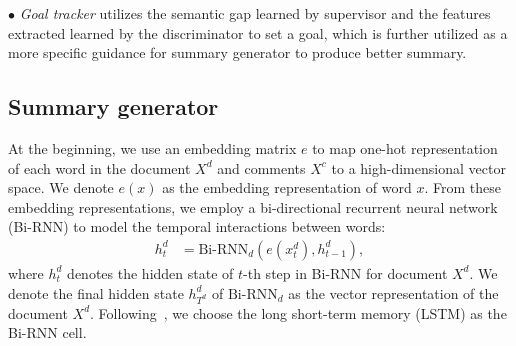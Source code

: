 \documentclass[letterpaper]{article} %
\begin{document}
$\bullet$ \textit{Goal tracker} utilizes the semantic gap learned by supervisor and the features extracted learned by the discriminator to set a goal, which is further utilized as a more specific guidance for summary generator to produce better summary.


\subsection{Summary generator}

At the beginning, we use an embedding matrix $e$ to map one-hot representation of each word in the document $X^d$ and comments $X^c$ to a high-dimensional vector space.
We denote $e(x)$ as the embedding representation of word $x$.
From these embedding representations, we employ a bi-directional recurrent neural network (Bi-RNN) to model the temporal interactions between words:
\begin{align}
    h^d_t &= \text{Bi-RNN}_d(e(x^d_t), h^d_{t-1}) ,
\end{align}
\noindent where $h^{d}_t$ denotes the hidden state of $t$-th step in Bi-RNN for document $X^d$.
We denote the final hidden state $h^d_{T^d}$ of $\text{Bi-RNN}_d$ as the vector representation of the document $X^d$.
Following~\cite{see2017get,Ma2018AHE}, we choose the long short-term memory (LSTM) as the Bi-RNN cell.
\end{document}
